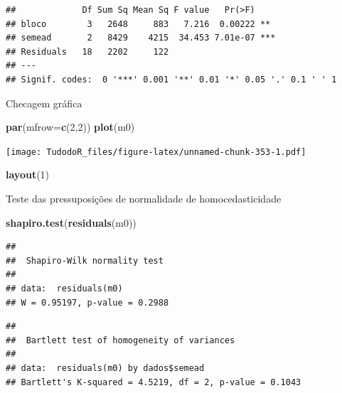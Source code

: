 \documentclass[
]{book}
\newenvironment{Shaded}{\begin{snugshade}}{\end{snugshade}}
\newcommand{\DataTypeTok}[1]{\textcolor[rgb]{0.13,0.29,0.53}{#1}}
\newcommand{\DecValTok}[1]{\textcolor[rgb]{0.00,0.00,0.81}{#1}}
\newcommand{\KeywordTok}[1]{\textcolor[rgb]{0.13,0.29,0.53}{\textbf{#1}}}
\newcommand{\NormalTok}[1]{#1}
\newcommand{\OperatorTok}[1]{\textcolor[rgb]{0.81,0.36,0.00}{\textbf{#1}}}
\begin{document}
\begin{verbatim}
##             Df Sum Sq Mean Sq F value   Pr(>F)    
## bloco        3   2648     883   7.216  0.00222 ** 
## semead       2   8429    4215  34.453 7.01e-07 ***
## Residuals   18   2202     122                     
## ---
## Signif. codes:  0 '***' 0.001 '**' 0.01 '*' 0.05 '.' 0.1 ' ' 1
\end{verbatim}

Checagem gráfica

\begin{Shaded}
\begin{Highlighting}[]
\KeywordTok{par}\NormalTok{(}\DataTypeTok{mfrow=}\KeywordTok{c}\NormalTok{(}\DecValTok{2}\NormalTok{,}\DecValTok{2}\NormalTok{))}
\KeywordTok{plot}\NormalTok{(m0)}
\end{Highlighting}
\end{Shaded}

\texttt{[image: TudodoR\_files/figure-latex/unnamed-chunk-353-1.pdf]}

\begin{Shaded}
\begin{Highlighting}[]
\KeywordTok{layout}\NormalTok{(}\DecValTok{1}\NormalTok{)}
\end{Highlighting}
\end{Shaded}

Teste das pressuposições de normalidade de homocedasticidade

\begin{Shaded}
\begin{Highlighting}[]
\KeywordTok{shapiro.test}\NormalTok{(}\KeywordTok{residuals}\NormalTok{(m0))}
\end{Highlighting}
\end{Shaded}

\begin{verbatim}
## 
##  Shapiro-Wilk normality test
## 
## data:  residuals(m0)
## W = 0.95197, p-value = 0.2988
\end{verbatim}

\begin{Shaded}
\end{Shaded}

\begin{verbatim}
## 
##  Bartlett test of homogeneity of variances
## 
## data:  residuals(m0) by dados$semead
## Bartlett's K-squared = 4.5219, df = 2, p-value = 0.1043
\end{verbatim}
\end{document}
